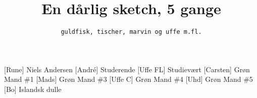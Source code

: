\documentclass[a4paper,11pt]{article}
\title{En dårlig sketch, 5 gange}
\author{\tt guldfisk, tischer, marvin og uffe m.fl.}
\begin{document}
\maketitle

\begin{roles}
[Rune] Niels Andersen
[Andr\'e] Studerende
[Uffe FL] Studievært
[Carsten] Grøn Mand \#1
[Mads] Grøn Mand \#3
[Uffe C] Grøn Mand \#4
[Uhd] Grøn Mand \#5
[Bo] Islandsk dulle
\end{roles}

\begin{props}
\end{props}
\end{document}
